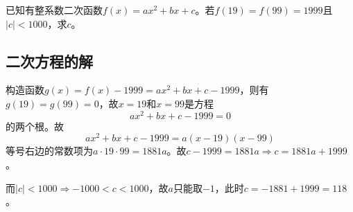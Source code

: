 

已知有整系数二次函数$f(x) = ax^2 + bx + c$。若$f(19) = f(99) = 1999$且$|c| < 1000$，求$c$。


\subsection{二次方程的解}

构造函数$g(x) = f(x) - 1999 = ax^2 + bx + c - 1999$，则有$g(19) = g(99) = 0$，故$x = 19$和$x = 99$是方程
\[ ax^2 + bx + c - 1999 = 0 \]
的两个根。故
\[ ax^2 + bx + c - 1999 = a(x - 19)(x - 99) \]
等号右边的常数项为$a\cdot19\cdot99 = 1881a$。故$c - 1999 = 1881a \Rightarrow c = 1881a + 1999$。

而$|c| < 1000 \Rightarrow -1000 < c < 1000$，故$a$只能取$-1$，此时$c = -1881 + 1999 = 118$。
